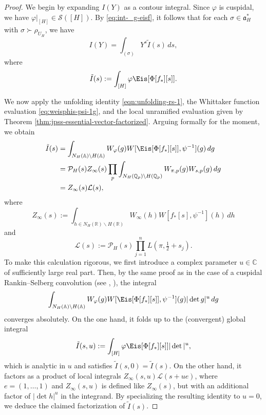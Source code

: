 \begin{proof}
  We begin by expanding $I(Y)$ as a contour integral.  Since $\varphi$ is cuspidal, we have $\varphi|_{[H]} \in \mathcal{S}([H])$.  By \eqref{eq:int-_g-eisf}, it follows that for each $\sigma \in \mathfrak{a}_H^*$ with $\sigma \succ \rho_{U_H}$, we have
  \begin{equation}\label{eq:iy-=-int_c}
    I(Y)
    =
    \int_{(\sigma)}
    Y^{s}
    \tilde{I}(s)
    \, d s,
  \end{equation}
  where
  \[
    \tilde{I}(s) := \int_{[H]} \varphi \Eis[\Phi[f_{\ast}][s]].
  \]

  We now apply the unfolding identity \eqref{eqn:unfolding-rs-1}, the Whittaker function evaluation \eqref{eq:weisphis-psi-1g}, and the local unramified evaluation given by Theorem \ref{thm:jpss-essential-vector-factorized}.  Arguing formally for the moment, we obtain
  \begin{align*}
    \nonumber
    \tilde{I}(s)
    &= \int_{N_H(\mathbb{A}) \backslash H(\mathbb{A})} W_\varphi(g) W[\Eis[\Phi[f_{\ast}][s]], \psi^{-1}](g) \, d g \\
    \nonumber
    &=
      \mathcal{P}_H(s) Z_\infty(s)
      \prod_p
      \int_{N_H(\mathbb{Q}_p) \backslash H(\mathbb{Q}_p)} W_{\pi,p}(g) W_{s,p}(g) \, d g \\
    &=
      Z_\infty(s) \mathcal{L}(s),
  \end{align*}
  where
  \[
    Z_\infty(s)
    :=
    \int_{h \in N_H(\mathbb{R}) \backslash H(\mathbb{R})}
    W_{\infty}(h) W[f_{\ast}[s], \psi^{-1}](h) \, d h
  \]
  and
  \[
    \mathcal{L}(s) :=
    \mathcal{P}_H(s)
    \prod_{j=1}^n L(\pi, \tfrac{1}{2} + s_j).
  \]
  To make this calculation  rigorous, we first introduce a complex parameter $u \in \mathbb{C}$ of sufficiently large real part.  Then, by the same proof as in the case of a cuspidal Rankin--Selberg convolution (see \cite[\S2.2.2]{MR2508768}, \cite[\S13]{MR528964}), the integral
  \begin{equation*}
    \int_{N_H(\mathbb{A}) \backslash H(\mathbb{A})} W_\varphi(g) W[\Eis[\Phi[f_{\ast}][s]], \psi^{-1}](g) |\det g|^u \, d g
  \end{equation*}
  converges absolutely.  On the one hand, it folds up to the (convergent) global integral
  \begin{equation*}
    \tilde{I}(s,u) := \int_{[H]} \varphi \Eis[\Phi[f_{\ast}][s]] |\det|^u,
  \end{equation*}
  which is analytic in $u$ and satisfies $\tilde{I}(s,0) = \tilde{I}(s)$.  On the other hand, it factors as a product of local integrals $Z_\infty(s,u) \mathcal{L}(s + u e)$, where $e = (1,\dotsc,1)$ and $Z_\infty(s,u)$ is defined like $Z_\infty(s)$, but with an additional factor of $|\det h|^u$ in the integrand.  By specializing the resulting identity to $u=0$, we deduce the claimed factorization of $\tilde{I}(s)$.


\end{proof}
